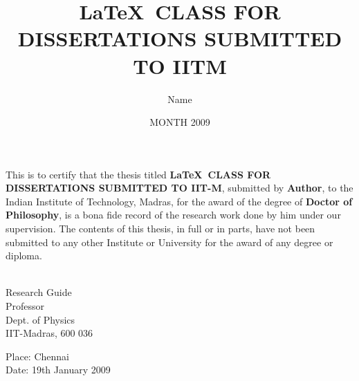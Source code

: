 \documentclass[PhD]{iitmdiss}
\begin{document}

\title{\LaTeX\ CLASS FOR DISSERTATIONS SUBMITTED TO IITM}

\author{Name}

\date{MONTH 2009}

\maketitle

\certificate

\vspace*{0.5in}

\noindent This is to certify that the thesis titled {\bf \LaTeX\ CLASS  
  FOR DISSERTATIONS SUBMITTED TO IIT-M}, submitted by {\bf Author}, 
  to the Indian Institute of Technology, Madras, for
the award of the degree of {\bf Doctor of Philosophy}, is a bona fide
record of the research work done by him under our supervision.  The
contents of this thesis, in full or in parts, have not been submitted
to any other Institute or University for the award of any degree or
diploma.

\vspace*{1.5in}

\begin{singlespacing}
\hspace*{-0.25in}
\parbox{2.5in}{
 \\
\noindent Research Guide \\ 
\noindent Professor \\
\noindent Dept. of Physics\\
\noindent IIT-Madras, 600 036 \\
} 
\hspace*{1.0in} 
\end{singlespacing}
\vspace*{0.25in}
\noindent Place: Chennai\\
Date: 19th January 2009 
\end{document}
